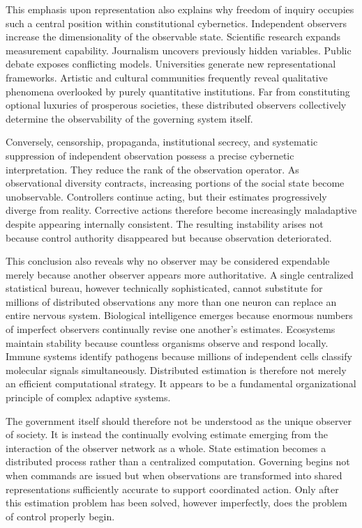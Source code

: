 \documentclass[12pt,a4paper]{article}
\begin{document}
This emphasis upon representation also explains why freedom of inquiry occupies such a central position within constitutional cybernetics. Independent observers increase the dimensionality of the observable state. Scientific research expands measurement capability. Journalism uncovers previously hidden variables. Public debate exposes conflicting models. Universities generate new representational frameworks. Artistic and cultural communities frequently reveal qualitative phenomena overlooked by purely quantitative institutions. Far from constituting optional luxuries of prosperous societies, these distributed observers collectively determine the observability of the governing system itself.

Conversely, censorship, propaganda, institutional secrecy, and systematic suppression of independent observation possess a precise cybernetic interpretation. They reduce the rank of the observation operator. As observational diversity contracts, increasing portions of the social state become unobservable. Controllers continue acting, but their estimates progressively diverge from reality. Corrective actions therefore become increasingly maladaptive despite appearing internally consistent. The resulting instability arises not because control authority disappeared but because observation deteriorated.

This conclusion also reveals why no observer may be considered expendable merely because another observer appears more authoritative. A single centralized statistical bureau, however technically sophisticated, cannot substitute for millions of distributed observations any more than one neuron can replace an entire nervous system. Biological intelligence emerges because enormous numbers of imperfect observers continually revise one another's estimates. Ecosystems maintain stability because countless organisms observe and respond locally. Immune systems identify pathogens because millions of independent cells classify molecular signals simultaneously. Distributed estimation is therefore not merely an efficient computational strategy. It appears to be a fundamental organizational principle of complex adaptive systems.

The government itself should therefore not be understood as the unique observer of society. It is instead the continually evolving estimate emerging from the interaction of the observer network as a whole. State estimation becomes a distributed process rather than a centralized computation. Governing begins not when commands are issued but when observations are transformed into shared representations sufficiently accurate to support coordinated action. Only after this estimation problem has been solved, however imperfectly, does the problem of control properly begin.
\end{document}
